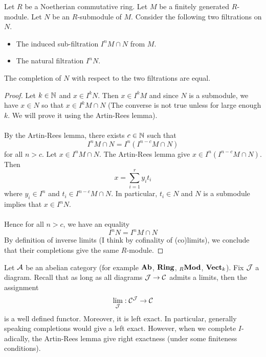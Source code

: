 \documentclass[a4paper]{article}
\begin{document}
\begin{prp}{}{}Let $R$ be a Noetherian commutative ring. Let $M$ be a finitely generated $R$-module. Let $N$ be an $R$-submodule of $M$. Consider the following two filtrations on $N$. 
\begin{itemize}
\item The induced sub-filtration $I^nM\cap N$ from $M$. 
\item The natural filtration $I^nN$. 
\end{itemize}
The completion of $N$ with respect to the two filtrations are equal. \tcbline
\begin{proof}
Let $k\in\mathbb{N}$ and $x\in I^kN$. Then $x\in I^kM$ and since $N$ is a submodule, we have $x\in N$ so that $x\in I^kM\cap N$ (The converse is not true unless for large enough $k$. We will prove it using the Artin-Rees lemma). \\~\\

By the Artin-Rees lemma, there exists $c\in\mathbb{N}$ such that $$I^nM\cap N=I^n(I^{n-c}M\cap N)$$ for all $n>c$. Let $x\in I^nM\cap N$. The Artin-Rees lemma give $x\in I^n(I^{n-c}M\cap N)$. Then $$x=\sum_{i=1}^ry_it_i$$ where $y_i\in I^n$ and $t_i\in I^{n-c}M\cap N$. In particular, $t_i\in N$ and $N$ is a submodule implies that $x\in I^nN$. \\~\\

Hence for all $n>c$, we have an equality $$I^nN=I^nM\cap N$$ By definition of inverse limits (I think by cofinality of (co)limits), we conclude that their completions give the same $R$-module. 
\end{proof}
\end{prp}

Let $\mathcal{A}$ be an abelian category (for example $\bold{Ab}$, $\bold{Ring}$, ${_R\bold{Mod}}$, $\bold{Vect}_k$). Fix $\mathcal{J}$ a diagram. Recall that as long as all diagrams $\mathcal{J}\to\mathcal{C}$ admits a limits, then the assignment $$\lim_{\mathcal{J}}:\mathcal{C}^{\mathcal{J}}\to\mathcal{C}$$ is a well defined functor. Moreover, it is left exact. In particular, generally speaking completions would give a left exact. However, when we complete $I$-adically, the Artin-Rees lemma give right exactness (under some finiteness conditions). 
\end{document}
